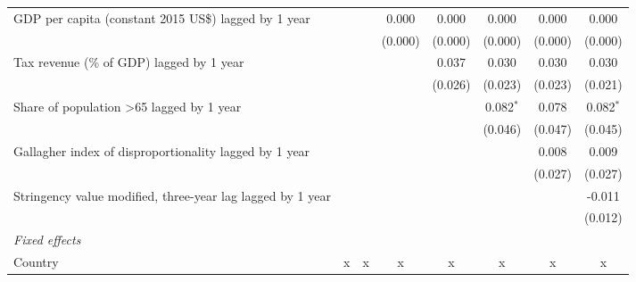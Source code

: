 \begin{tabular}{lccccccc}
   GDP per capita (constant 2015 US\$) lagged by 1 year                                   &                &               & 0.000          & 0.000         & 0.000         & 0.000         & 0.000\\   
                                                                                          &                &               & (0.000)        & (0.000)       & (0.000)       & (0.000)       & (0.000)\\   
   Tax revenue (\% of GDP) lagged by 1 year                                               &                &               &                & 0.037         & 0.030         & 0.030         & 0.030\\   
                                                                                          &                &               &                & (0.026)       & (0.023)       & (0.023)       & (0.021)\\   
   Share of population >65 lagged by 1 year                                               &                &               &                &               & 0.082$^{*}$   & 0.078         & 0.082$^{*}$\\   
                                                                                          &                &               &                &               & (0.046)       & (0.047)       & (0.045)\\   
   Gallagher index of disproportionality lagged by 1 year                                 &                &               &                &               &               & 0.008         & 0.009\\   
                                                                                          &                &               &                &               &               & (0.027)       & (0.027)\\   
   Stringency value modified, three-year lag lagged by 1 year                             &                &               &                &               &               &               & -0.011\\   
                                                                                          &                &               &                &               &               &               & (0.012)\\   
   \emph{Fixed effects}\\
   Country                                                                                & x              & x             & x              & x             & x             & x             & x\\  

\end{tabular}
